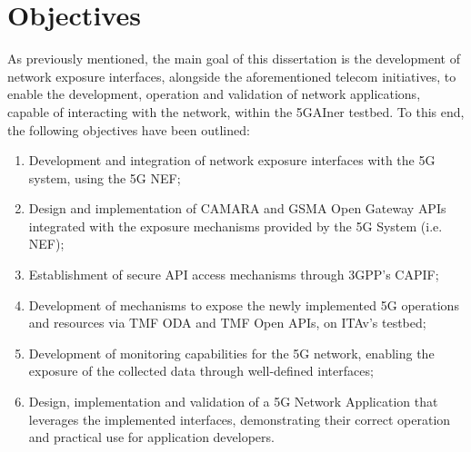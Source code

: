 \section{Objectives}
\label{chap:introduction:objectives}

As previously mentioned, the main goal of this dissertation is the development of network exposure interfaces, alongside the aforementioned telecom initiatives, to enable the development, operation and validation of network applications, capable of interacting with the network, within the 5GAIner testbed. To this end, the following objectives have been outlined:

\begin{enumerate}
    \item Development and integration of network exposure interfaces with the \acs{5G} system, using the \acs{5G} \acs{NEF};
    \item Design and implementation of CAMARA and \acs{GSMA} Open Gateway \acsp{API} integrated with the exposure mechanisms provided by the \acs{5G} System (i.e. \acs{NEF});
    \item Establishment of secure \acs{API} access mechanisms through \acs{3GPP}'s \acs{CAPIF};
    \item Development of mechanisms to expose the newly implemented \acs{5G} operations and resources via \acs{TMF} \acs{ODA} and \acs{TMF} Open \acsp{API}, on \acs{ITAv}'s testbed;
    \item Development of monitoring capabilities for the \acs{5G} network, enabling the exposure of the collected data through well-defined interfaces;
    \item Design, implementation and validation of a \acs{5G} Network Application that leverages the implemented interfaces, demonstrating their correct operation and practical use for application developers.
\end{enumerate}